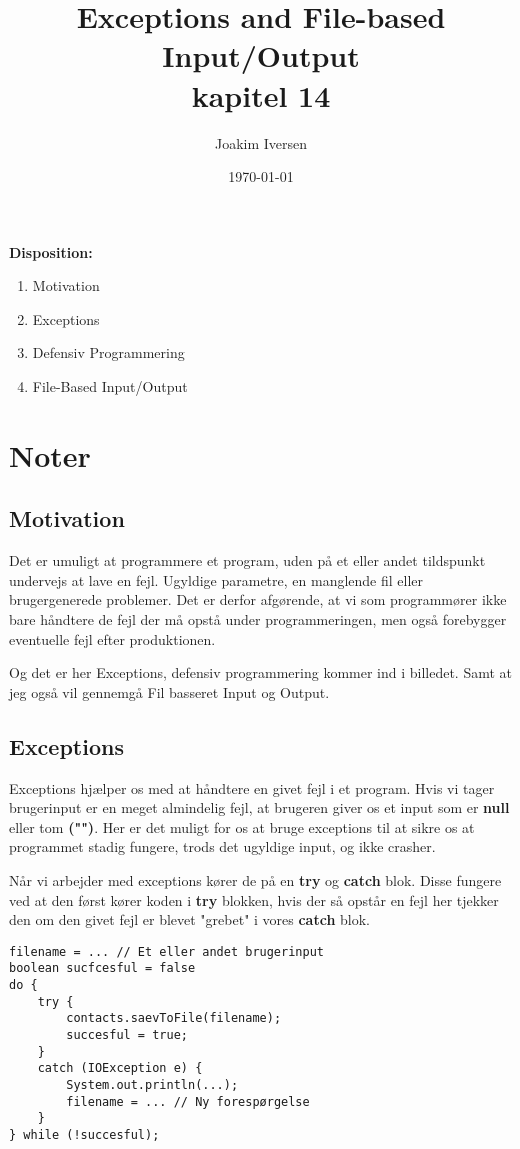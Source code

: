 \documentclass{article}
\title{Exceptions and File-based Input/Output \\
        kapitel 14}
\author{Joakim Iversen}
\date{\today}
\begin{document}
\maketitle
\newpage

\textbf{\Large Disposition:}
\begin{enumerate}
    \item Motivation
    \item Exceptions
    \item Defensiv Programmering
    \item File-Based Input/Output
\end{enumerate}
\newpage


\section*{Noter}
\subsection*{Motivation}
Det er umuligt at programmere et program, uden på et eller andet tildspunkt undervejs at lave en fejl. Ugyldige parametre, en manglende fil eller brugergenerede problemer. Det er derfor afgørende, at vi som programmører ikke bare håndtere de fejl der må opstå under programmeringen, men også forebygger eventuelle fejl efter produktionen. 

Og det er her Exceptions, defensiv programmering kommer ind i billedet. Samt at jeg også vil gennemgå Fil basseret Input og Output.

\subsection*{Exceptions}
Exceptions hjælper os med at håndtere en givet fejl i et program. Hvis vi tager brugerinput er en meget almindelig fejl, at brugeren giver os et input som er \textbf{null} eller tom \textbf{("")}. Her er det muligt for os at bruge exceptions til at sikre os at programmet stadig fungere, trods det ugyldige input, og ikke crasher.

Når vi arbejder med exceptions kører de på en \textbf{try} og \textbf{catch} blok. Disse fungere ved at den først kører koden i \textbf{try} blokken, hvis der så opstår en fejl her tjekker den om den givet fejl er blevet "grebet" i vores \textbf{catch} blok.

\begin{verbatim}
filename = ... // Et eller andet brugerinput
boolean sucfcesful = false
do {
    try {
        contacts.saevToFile(filename);
        succesful = true;
    }
    catch (IOException e) {
        System.out.println(...);
        filename = ... // Ny forespørgelse
    }
} while (!succesful);
\end{verbatim}
\end{document}
